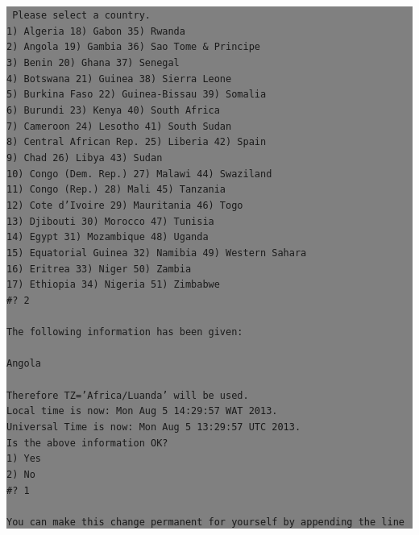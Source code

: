 \documentclass[12pt]{article}
\begin{document}
\colorbox{grey}{\parbox[t]{0.95\linewidth}{ \vspace*{0.5cm} { 
{\tt 
Please select a country.\\
 1) Algeria		  18) Gabon		    35) Rwanda\\
 2) Angola		  19) Gambia		    36) Sao Tome \& Principe\\
 3) Benin		  20) Ghana		    37) Senegal\\
 4) Botswana		  21) Guinea		    38) Sierra Leone\\
 5) Burkina Faso	  22) Guinea-Bissau	    39) Somalia\\
 6) Burundi		  23) Kenya		    40) South Africa\\
 7) Cameroon		  24) Lesotho		    41) South Sudan\\
 8) Central African Rep.  25) Liberia		    42) Spain\\
 9) Chad		  26) Libya		    43) Sudan\\
10) Congo (Dem. Rep.)	  27) Malawi		    44) Swaziland\\
11) Congo (Rep.)	  28) Mali		    45) Tanzania\\
12) Cote d'Ivoire	  29) Mauritania	    46) Togo\\
13) Djibouti		  30) Morocco		    47) Tunisia\\
14) Egypt		  31) Mozambique	    48) Uganda\\
15) Equatorial Guinea	  32) Namibia		    49) Western Sahara\\
16) Eritrea		  33) Niger		    50) Zambia\\
17) Ethiopia		  34) Nigeria		    51) Zimbabwe\\
\#? 2\\
\\
The following information has been given:\\
\\
	Angola\\
\\
Therefore TZ='Africa/Luanda' will be used.\\
Local time is now:	Mon Aug  5 14:29:57 WAT 2013.\\
Universal Time is now:	Mon Aug  5 13:29:57 UTC 2013.\\
Is the above information OK?\\
1) Yes\\
2) No\\
\#? 1\\
\\
You can make this change permanent for yourself by appending the line\\
}}}}
\end{document}
